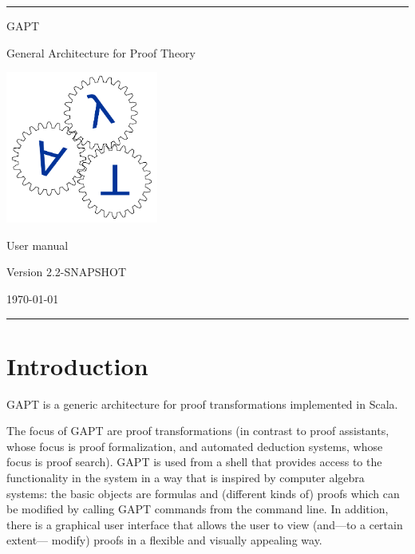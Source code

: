 \documentclass[a4paper,11pt]{article}
\begin{document}
\begin{titlepage}
\begin{center}

\hrule

\vspace*{20mm}

{\Huge GAPT}

\vspace*{5mm}

{\huge General Architecture for Proof Theory}

\vspace*{20mm}

\includegraphics[keepaspectratio,width=5cm]{logo}

\vspace*{20mm}

{\Huge User manual}

\vspace*{10mm}
{\Large Version 2.2-SNAPSHOT}
\vspace*{10mm}

{\Large \today}

\vspace*{20mm}

\hrule
\end{center}

\end{titlepage}

\listoffixmes

\tableofcontents
\vfill
\pagebreak

\section{Introduction}

GAPT is a generic architecture for proof transformations implemented in Scala.

The focus of GAPT are proof transformations (in contrast to proof assistants,
whose focus is proof formalization, and automated deduction systems, whose focus
is proof search). GAPT is used from a shell that provides access to the functionality
in the system in a way that is inspired by computer algebra systems: the basic
objects are formulas and (different kinds of) proofs which can be modified
by calling GAPT commands from the command line. In addition, there
is a graphical user interface that allows the user to view (and—to a certain extent—
modify) proofs in a flexible and visually appealing way.
\end{document}
